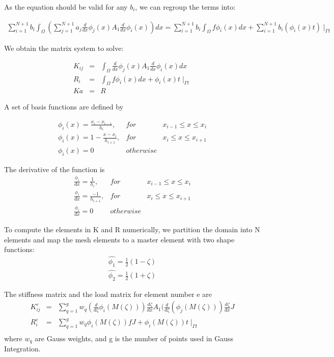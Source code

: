 \documentclass[paper=a4, fontsize=11pt]{article} %
\begin{document}
As the equation should be valid for any $b_i$, we can regroup the terms into:

\begin{eqnarray}
\sum_{i=1}^{N+1} b_i \int_{\Omega} (\sum_{j=1}^{N+1} a_j \frac{d}{dx} \phi_j(x) A_1 \frac{d}{dx} \phi_i(x)) dx = \sum_{i=1}^{N+1} b_i \int_{\Omega} f \phi_i(x) dx + \sum_{i=1}^{N+1} b_i (\phi_i(x) t) \mid _{\Gamma t}
\end{eqnarray}

We obtain the matrix system to solve:
 
\begin{eqnarray}
K_{ij} &=& \int_{\Omega} \frac{d}{dx} \phi_j(x) A_1 \frac{d}{dx} \phi_i(x) dx \nonumber\\
R_i &=& \int_{\Omega} f \phi_i(x) dx + \phi_i(x) t \mid _{\Gamma t}\nonumber\\
K a &=& R
\end{eqnarray}

A set of basis functions are defined by 

\begin{eqnarray}
\phi_i (x) = \frac{x_i - x_{i-1}}{h_i}, & for &x_{i-1} \leq x \leq x_i \nonumber\\
\phi_i (x) = 1-\frac{x - x_i}{h_{i+1}}, & for &x_{i} \leq x \leq x_{i+1}\nonumber\\
\phi_i (x) = 0 & otherwise
\end{eqnarray}

The derivative of the function is
\begin{eqnarray}
\frac{\phi_i} {dx}  =   \frac{1}{h_i}, & for &x_{i-1} \leq x \leq x_i \nonumber\\
\frac{\phi_i} {dx}  =   \frac{-1}{h_{i+1}}, & for &x_{i} \leq x \leq x_{i+1}\nonumber\\
\frac{\phi_i} {dx}  =     0 & otherwise
\end{eqnarray}

To compute the elements in K and R numerically, we partition the domain into N elements and map the mesh elements to a master element with two shape functions:
\begin{eqnarray}
\hat{\phi_1}     =   \frac{1}{2}(1-\zeta) \nonumber\\
\hat{\phi_2}     =   \frac{1}{2}(1+\zeta)
\end{eqnarray}

The stiffness matrix and the load matrix for element number e are
\begin{eqnarray}
K_{ij}^e &=& \sum_{q=1}^g w_q(\frac{d}{d \zeta} \phi_i(M(\zeta))) \frac{d \zeta}{dx} A_1 (\frac{d}{d \zeta} (\phi_j(M(\zeta))) \frac{d \zeta} {dx} J \nonumber\\
R_i^e &=& \sum_{q=1}^g w_q \phi_i(M(\zeta)) fJ + \phi_i(M(\zeta)) t \mid _{\Gamma t}\nonumber\\
\end{eqnarray}
where $w_q$ are Gauss weights, and g is the number of points used in Gauss Integration.
\end{document}
